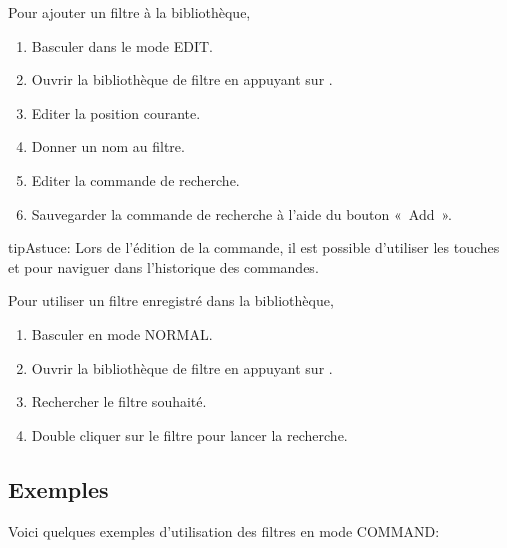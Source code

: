 \documentclass[letterpaper,10pt,french]{sphinxmanual}
\begin{document}
\sphinxAtStartPar
Pour ajouter un filtre à la bibliothèque,
\begin{enumerate}
%
\item {} 
\sphinxAtStartPar
Basculer dans le mode EDIT.

\item {} 
\sphinxAtStartPar
Ouvrir la bibliothèque de filtre en appuyant sur .

\item {} 
\sphinxAtStartPar
Editer la position courante.

\item {} 
\sphinxAtStartPar
Donner un nom au filtre.

\item {} 
\sphinxAtStartPar
Editer la commande de recherche.

\item {} 
\sphinxAtStartPar
Sauvegarder la commande de recherche à l’aide du bouton « Add ».

\end{enumerate}

\begin{sphinxadmonition}{tip}{Astuce:}
\sphinxAtStartPar
Lors de l’édition de la commande, il est possible d’utiliser les touches
 et  pour naviguer dans l’historique des commandes.
\end{sphinxadmonition}

\sphinxAtStartPar
Pour utiliser un filtre enregistré dans la bibliothèque,
\begin{enumerate}
%
\item {} 
\sphinxAtStartPar
Basculer en mode NORMAL.

\item {} 
\sphinxAtStartPar
Ouvrir la bibliothèque de filtre en appuyant sur .

\item {} 
\sphinxAtStartPar
Rechercher le filtre souhaité.

\item {} 
\sphinxAtStartPar
Double cliquer sur le filtre pour lancer la recherche.

\end{enumerate}


\subsection{Exemples}
\label{\detokenize{annexe_filtres:exemples}}
\sphinxAtStartPar
Voici quelques exemples d’utilisation des filtres en mode COMMAND:
\end{document}
